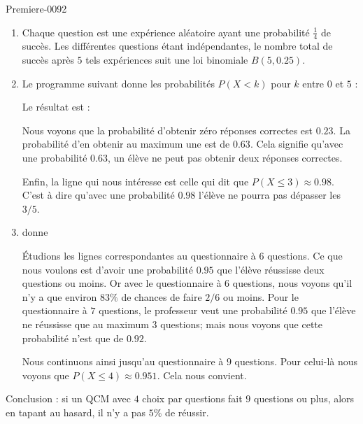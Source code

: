 
\begin{corrige}{Premiere-0092}

    \begin{enumerate}
        \item
            Chaque question est une expérience aléatoire ayant une probabilité \( \frac{1}{ 4 }\) de succès. Les différentes questions étant indépendantes, le nombre total de succès après \( 5\) tels expériences suit une loi binomiale \( B(5,0.25)\).
        \item
            Le programme suivant donne les probabilités \( P(X<k)\) pour \( k\) entre \( 0\) et \( 5\) :

Le résultat est :

            Nous voyons que la probabilité d'obtenir zéro réponses correctes est \( 0.23\). La probabilité d'en obtenir au maximum une est de \( 0.63\). Cela signifie qu'avec une probabilité \( 0.63\), un élève ne peut pas obtenir deux réponses correctes.

            Enfin, la ligne qui nous intéresse est celle qui dit que \( P(X\leq 3)\approx 0.98\). C'est à dire qu'avec une probabilité \( 0.98\) l'élève ne pourra pas dépasser les \( 3/5\).

        \item

donne


        Étudions les lignes correspondantes au questionnaire à \( 6\) questions. Ce que nous voulons est d'avoir une probabilité \( 0.95\) que l'élève réussisse deux questions ou moins. Or avec le questionnaire à \( 6\) questions, nous voyons qu'il n'y a que environ \( 83\%\) de chances de faire \( 2/6\) ou moins. Pour le questionnaire à \( 7\) questions, le professeur veut une probabilité \( 0.95\) que l'élève ne réussisse que au maximum \( 3\) questions; mais nous voyons que cette probabilité n'est que de $0.92$.

        Nous continuons ainsi jusqu'au questionnaire à \( 9\) questions. Pour celui-là nous voyons que \( P(X\leq 4)\approx 0.951\). Cela nous convient.

    \end{enumerate}
    Conclusion : si un QCM avec \( 4\) choix par questions fait \( 9\) questions ou plus, alors en tapant au hasard, il n'y a pas \( 5\%\) de réussir.

\end{corrige}
